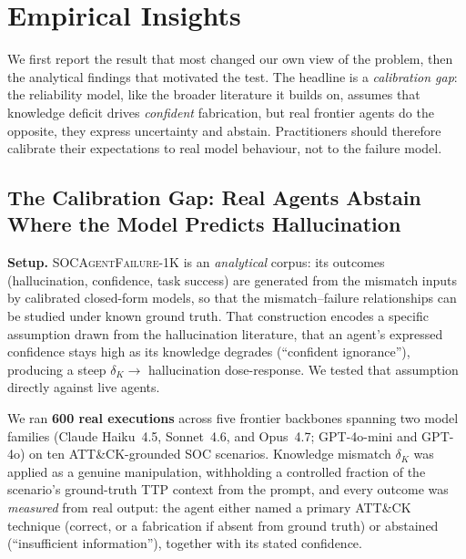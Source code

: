\documentclass[journal,compsoc]{IEEEtran}
\newcommand{\SAFK}{\textsc{SOCAgentFailure-1K}}
\begin{document}
\section{Empirical Insights}

We first report the result that most changed our own view of the
problem, then the analytical findings that motivated the test. The
headline is a \textit{calibration gap}: the reliability model, like the
broader literature it builds on, assumes that knowledge deficit drives
\textit{confident} fabrication, but real frontier agents do the
opposite, they express uncertainty and abstain. Practitioners should
therefore calibrate their expectations to real model behaviour, not to
the failure model.

\subsection{The Calibration Gap: Real Agents Abstain Where the Model
Predicts Hallucination}

\textbf{Setup.} \SAFK{} is an \textit{analytical} corpus: its outcomes
(hallucination, confidence, task success) are generated from the
mismatch inputs by calibrated closed-form models, so that the
mismatch--failure relationships can be studied under known ground
truth. That construction encodes a specific assumption drawn from the
hallucination literature, that an agent's expressed confidence stays
high as its knowledge degrades (``confident ignorance''), producing a
steep $\delta_K \to$ hallucination dose-response. We tested that
assumption directly against live agents.

We ran \textbf{600 real executions} across five frontier backbones
spanning two model families (Claude Haiku~4.5, Sonnet~4.6, and
Opus~4.7; GPT-4o-mini and GPT-4o) on ten ATT\&CK-grounded SOC
scenarios. Knowledge mismatch $\delta_K$ was applied as a genuine
manipulation, withholding a controlled fraction of the scenario's
ground-truth TTP context from the prompt, and every outcome was
\textit{measured} from real output: the agent either named a primary
ATT\&CK technique (correct, or a fabrication if absent from ground
truth) or abstained (``insufficient information''), together with its
stated confidence.
\end{document}
